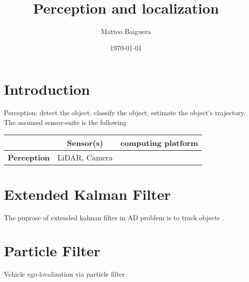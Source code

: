 \documentclass[•]{article}
\begin{document}
\title{Perception and localization}
\author{Matteo Baiguera}
\maketitle


\date{\today}

\section{Introduction}
Perception: detect the object, classify the object, estimate the object's trajectory.\\
The assumed sensor-suite is the following 
\begin{center}
\begin{tabular}{c|c|c|}
\hline
				   & Sensor(s)& computing platform\\
\hline
\textbf{Perception}& LiDAR, Camera&\\
\hline

\end{tabular}
\end{center}


\section{Extended Kalman Filter}

The puprose of extended kalman filter in AD problem is to track objects .

\section{Particle Filter}
Vehicle ego-localization via particle filter
\end{document}
